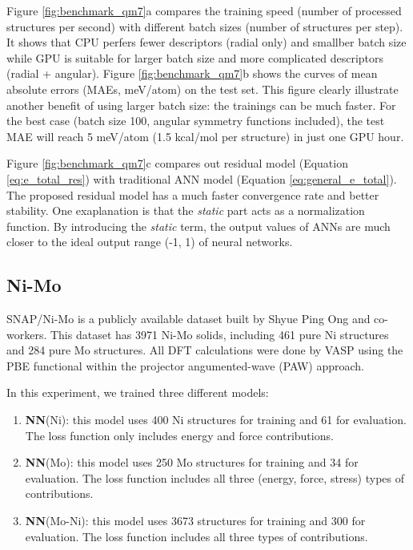 \documentclass[preprint]{revtex4-2}
\begin{document}
Figure \ref{fig:benchmark_qm7}a compares the training speed (number of processed 
structures per second) with different batch sizes (number of structures per 
step). It shows that CPU perfers fewer descriptors (radial only) and smallber 
batch size while GPU is suitable for larger batch size and more complicated 
descriptors (radial + angular). 
Figure \ref{fig:benchmark_qm7}b shows the curves of mean absolute errors 
(MAEs, meV/atom) on the test set. This figure clearly illustrate another benefit 
of using larger batch size: the trainings can be much faster. For the best case 
(batch size 100, angular symmetry functions included), the test MAE will reach 5 
meV/atom (1.5 kcal/mol per structure) in just one GPU hour. 

Figure \ref{fig:benchmark_qm7}c compares out residual model (Equation 
\ref{eq:e_total_res}) with traditional ANN model (Equation 
\ref{eq:general_e_total}). The proposed residual model has a much faster 
convergence rate and better stability. One exaplanation is that the 
\textit{static} part acts as a normalization function. By introducing the 
\textit{static} term, the output values of ANNs are much closer to the ideal 
output range (-1, 1) of neural networks.

% 
%
\subsection{Ni-Mo}

SNAP/Ni-Mo\cite{SNAP_Mo_2017, SNAP_2018} is a publicly available dataset built 
by Shyue Ping Ong and co-workers. This dataset has 3971 Ni-Mo solids, including 
461 pure Ni structures and 284 pure Mo structures. All DFT calculations were 
done by VASP\cite{VASP} using the PBE\cite{PBE} functional within the projector 
angumented-wave (PAW)\cite{PAW} approach.

In this experiment, we trained three different models:
\begin{enumerate}
    
    \item \textbf{NN}(Ni): this model uses 400 Ni structures for training and 61 
    for evaluation. The loss function only includes energy and force 
    contributions.
    
    \item \textbf{NN}(Mo): this model uses 250 Mo structures for training and 34 
    for evaluation. The loss function includes all three (energy, force, stress) 
    types of contributions. 
    
    \item \textbf{NN}(Mo-Ni): this model uses 3673 structures for training and 
    300 for evaluation. The loss function includes all three types of 
    contributions.

\end{enumerate}
\end{document}
